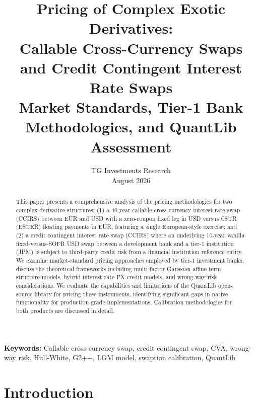 \documentclass[11pt,a4paper]{article}
\theoremstyle{definition}
\begin{document}
\title{\textbf{Pricing of Complex Exotic Derivatives:\\
Callable Cross-Currency Swaps and Credit Contingent Interest Rate Swaps}\\[1em]
\large Market Standards, Tier-1 Bank Methodologies, and QuantLib Assessment}

\author{TG Investments Research\\
\small August 2026}

\date{}

\maketitle

\begin{abstract}
This paper presents a comprehensive analysis of the pricing methodologies for two complex derivative structures: (1) a 40-year callable cross-currency interest rate swap (CCIRS) between EUR and USD with a zero-coupon fixed leg in USD versus €STR (ESTER) floating payments in EUR, featuring a single European-style exercise; and (2) a credit contingent interest rate swap (CCIRS) where an underlying 10-year vanilla fixed-versus-SOFR USD swap between a development bank and a tier-1 institution (JPM) is subject to third-party credit risk from a financial institution reference entity. We examine market-standard pricing approaches employed by tier-1 investment banks, discuss the theoretical frameworks including multi-factor Gaussian affine term structure models, hybrid interest rate-FX-credit models, and wrong-way risk considerations. We evaluate the capabilities and limitations of the QuantLib open-source library for pricing these instruments, identifying significant gaps in native functionality for production-grade implementations. Calibration methodologies for both products are discussed in detail.
\end{abstract}

\textbf{Keywords:} Callable cross-currency swap, credit contingent swap, CVA, wrong-way risk, Hull-White, G2++, LGM model, swaption calibration, QuantLib

\tableofcontents
\newpage

\section{Introduction}
\end{document}
